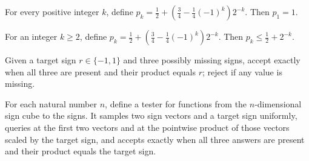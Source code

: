 \begin{theorem}
\label{FABL.parityAndAcceptanceProbability_one}
\leanok
{}
For every positive integer $k$, define
$p_k=\frac12+\left(\frac34-\frac14(-1)^k\right)2^{-k}$. Then $p_1=1$.
\end{theorem}

\begin{theorem}
\label{FABL.parityAndAcceptanceProbability_le_twoPowInv}
\leanok
{}
For an integer $k\ge 2$, define $p_k=\frac12+\left(\frac34-\frac14(-1)^k\right)2^{-k}$.
Then $p_k\le \frac12+2^{-k}$.
\end{theorem}

\begin{definition}
\label{FABL.oddBLREquationTranscriptAccept}
\leanok
{}
Given a target sign $r\in\{-1,1\}$ and three possibly missing signs, accept exactly when
all three are present and their product equals $r$; reject if any value is missing.
\end{definition}

\begin{definition}
\label{FABL.oddBLREquationFunctionTester}
\leanok
{}
For each natural number $n$, define a tester for functions from the $n$-dimensional sign
cube to the signs. It samples two sign vectors and a target sign uniformly, queries at
the first two vectors and at the pointwise product of those vectors scaled by the target
sign, and accepts exactly when all three answers are present and their product equals
the target sign.
\end{definition}

